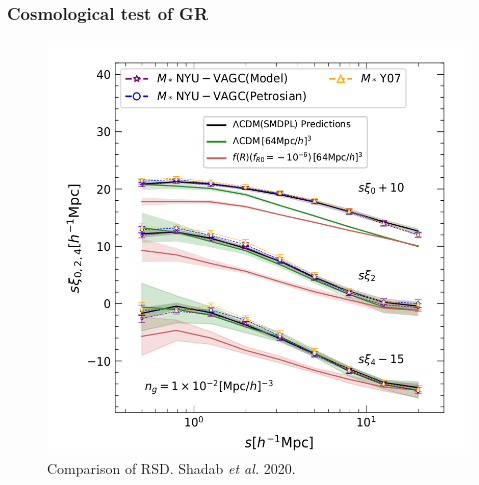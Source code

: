 \documentclass{beamer}
\makeatletter
\newcommand{\mylabel}{%
}
\makeatother
\begin{document}
\begin{frame}[plain,label=grcosmology]
    \frametitle{Cosmological test of GR\mylabel}
    \begin{figure}
        \includegraphics[height=.8\textheight]{images/alam-rsd.png}
        \caption{Comparison of RSD. Shadab \emph{et al.} 2020.}
    \end{figure}
\end{frame}
\end{document}
